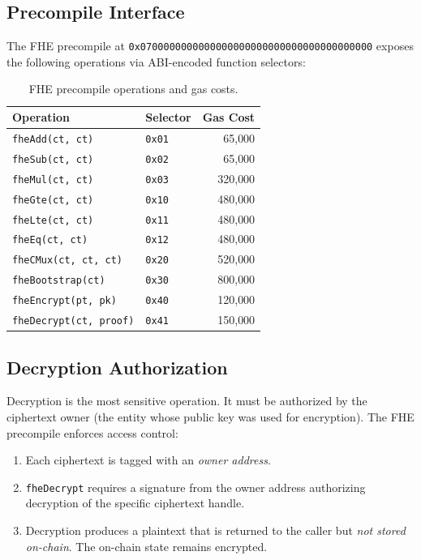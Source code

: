 \documentclass[11pt,a4paper]{article}
\begin{document}
\subsection{Precompile Interface}

The FHE precompile at \texttt{0x0700000000000000000000000000000000000000} exposes the
following operations via ABI-encoded function selectors:

\begin{table}[ht]
\centering
\caption{FHE precompile operations and gas costs.}
\label{tab:fhe-gas}
\begin{tabular}{llr}
\toprule
\textbf{Operation} & \textbf{Selector} & \textbf{Gas Cost} \\
\midrule
\texttt{fheAdd(ct, ct)} & \texttt{0x01} & 65{,}000 \\
\texttt{fheSub(ct, ct)} & \texttt{0x02} & 65{,}000 \\
\texttt{fheMul(ct, ct)} & \texttt{0x03} & 320{,}000 \\
\texttt{fheGte(ct, ct)} & \texttt{0x10} & 480{,}000 \\
\texttt{fheLte(ct, ct)} & \texttt{0x11} & 480{,}000 \\
\texttt{fheEq(ct, ct)} & \texttt{0x12} & 480{,}000 \\
\texttt{fheCMux(ct, ct, ct)} & \texttt{0x20} & 520{,}000 \\
\texttt{fheBootstrap(ct)} & \texttt{0x30} & 800{,}000 \\
\texttt{fheEncrypt(pt, pk)} & \texttt{0x40} & 120{,}000 \\
\texttt{fheDecrypt(ct, proof)} & \texttt{0x41} & 150{,}000 \\
\bottomrule
\end{tabular}
\end{table}

\subsection{Decryption Authorization}

Decryption is the most sensitive operation. It must be authorized by the ciphertext
owner (the entity whose public key was used for encryption). The FHE precompile
enforces access control:

\begin{enumerate}[leftmargin=2em]
  \item Each ciphertext is tagged with an \emph{owner address}.
  \item \texttt{fheDecrypt} requires a signature from the owner address authorizing
        decryption of the specific ciphertext handle.
  \item Decryption produces a plaintext that is returned to the caller but
        \emph{not stored on-chain}. The on-chain state remains encrypted.
\end{enumerate}
\end{document}
